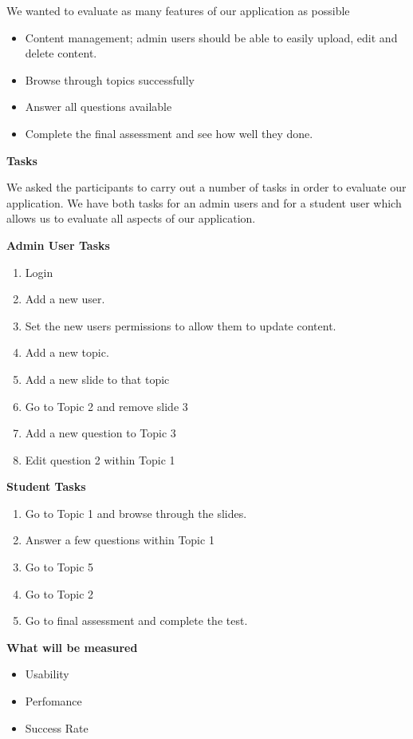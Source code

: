 \documentclass{l3proj}
\begin{document}
We wanted to evaluate as many features of our application as possible

\begin{itemize}
\item Content management; admin users should be able to easily upload, edit and delete content.
\item Browse through topics successfully
\item Answer all questions available
\item Complete the final assessment and see how well they done.
\end{itemize}

\textbf{Tasks}

We asked the participants to carry out a number of tasks in order to evaluate our application. We have both tasks for an admin users and for a student user which allows us to evaluate all aspects of our application.

\textbf{Admin User Tasks}

\begin{enumerate}
\item Login
\item Add a new user.
\item Set the new users permissions to allow them to update content.
\item Add a new topic.
\item Add a new slide to that topic
\item Go to Topic 2 and remove slide 3
\item Add a new question to Topic 3
\item Edit question 2 within Topic 1
\end{enumerate}

\textbf{Student Tasks}

\begin{enumerate}
\item Go to Topic 1 and browse through the slides.
\item Answer a few questions within Topic 1
\item Go to Topic 5
\item Go to Topic 2
\item Go to final assessment and complete the test.
\end{enumerate}

\textbf{What will be measured}

\begin{itemize}
\item Usability
\item Perfomance
\item Success Rate
\end{itemize}
\end{document}
